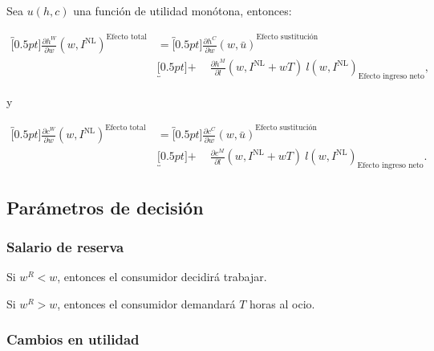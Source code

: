 \documentclass[8pt,a4paper]{extarticle}
\begin{document}
\begin{multicols}{3}
\begin{boxtheo}
	Sea $u(h, c)$ una función de utilidad monótona, entonces:
	
	\begin{equation*}
	\begin{aligned}
		\overbracket[0.5pt]{\frac{\partial h^W}{\partial w} (w, I^{\text{NL}})}^{\text{Efecto total}} \quad &= \overbracket[0.5pt]{\frac{\partial h^C}{\partial w} (w, \bar{u})}^{\text{Efecto sustitución}} \\
																						   & \underbracket[0.5pt]{ + \quad\ \frac{\partial h^M}{\partial l} (w, I^{\text{NL}} + wT)\ l (w, I^{\text{NL}})}_{\text{Efecto ingreso neto}},
	\end{aligned}
	\end{equation*}
	
	y
	
	\begin{equation*}
	\begin{aligned}
		\overbracket[0.5pt]{\frac{\partial c^W}{\partial w} (w, I^{\text{NL}})}^{\text{Efecto total}} \quad &= \overbracket[0.5pt]{\frac{\partial c^C}{\partial w} (w, \bar{u})}^{\text{Efecto sustitución}} \\
																						   & \underbracket[0.5pt]{ + \quad\ \frac{\partial c^M}{\partial l} (w, I^{\text{NL}} + wT)\ l (w, I^{\text{NL}})}_{\text{Efecto ingreso neto}}.
	\end{aligned}
	\end{equation*}
\end{boxtheo}

\sectionbreak

\subsection{Parámetros de decisión}

\subsubsection*{Salario de reserva}

\begin{eqlist}
\item Si $ w^R < w $, entonces el consumidor decidirá trabajar.
\item Si $ w^R > w $, entonces el consumidor demandará $T$ horas al ocio.
\end{eqlist}

\subsubsection*{Cambios en utilidad}


\end{multicols}
\end{document}
